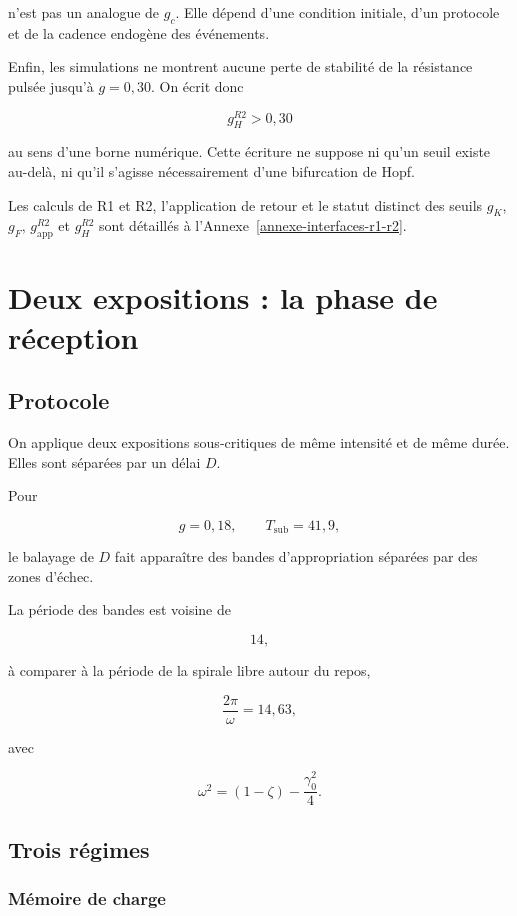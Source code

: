 n'est pas un analogue de \(g_c\). Elle dépend d'une condition initiale,
d'un protocole et de la cadence endogène des événements.

Enfin, les simulations ne montrent aucune perte de stabilité de la
résistance pulsée jusqu'à \(g=0{,}30\). On écrit donc

\[
g_H^{R2}>0{,}30
\]

au sens d'une borne numérique. Cette écriture ne suppose ni qu'un seuil existe au-delà, ni qu'il s'agisse nécessairement d'une bifurcation de Hopf.

Les calculs de R1 et R2, l'application de retour et le statut distinct des seuils \(g_K\), \(g_F\), \(g_{\mathrm{app}}^{R2}\) et \(g_H^{R2}\) sont détaillés à l'Annexe~\ref{annexe-interfaces-r1-r2}.

\chapter{Deux expositions : la phase de réception}\label{t2-deux-expositions-la-phase-de-reception}

\section{Protocole}\label{t2-protocole}

On applique deux expositions sous-critiques de même intensité et de même durée. Elles sont séparées par un délai \(D\).

Pour

\[
g=0{,}18,
\qquad
T_{\mathrm{sub}}=41{,}9,
\]

le balayage de \(D\) fait apparaître des bandes d'appropriation séparées
par des zones d'échec.

La période des bandes est voisine de

\[
14,
\]

à comparer à la période de la spirale libre autour du repos,

\[
\frac{2\pi}{\omega}=14{,}63,
\]

avec

\[
\omega^2=(1-\zeta)-\frac{\gamma_0^2}{4}.
\]

\section{Trois régimes}\label{t2-trois-regimes}

\subsection{Mémoire de charge}\label{t2-memoire-de-charge}

